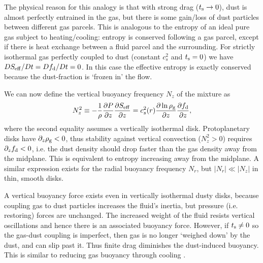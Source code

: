 
The physical reason for this analogy is that with strong drag
($t_\mathrm{s}\to0$), dust is almost perfectly entrained in the gas, but
there is some gain/loss of dust particles between different  
gas parcels. This is analogous to the entropy of an ideal 
pure gas subject to heating/cooling: entropy is conserved following
a gas parcel, except if there is heat exchange between a fluid parcel and the
surrounding. For strictly isothermal gas perfectly coupled to dust
(constant $c_s^2$ and $t_\mathrm{s}=0$) we have 
$DS_\mathrm{eff}/ D t = Df_\mathrm{d}/D t=0$. In this case the effective 
entropy is exactly conserved because the dust-fraction is `frozen in' the
flow. 


We can now define the vertical buoyancy frequency $N_z$ of the mixture
as    
\begin{align}
  N_z^2 \equiv - \frac{1}{\rho}\frac{\partial P}{\partial z}\frac{\partial S_\mathrm{eff}}{\partial z}
  =c_s^2(r) \frac{\partial \ln{\rho_\mathrm{g}}}{\partial z}\frac{\partial f_\mathrm{d}}{\partial z},
\end{align}
where the second equality assumes a vertically isothermal disk. 
Protoplanetary disks have $\partial_z\rho_\mathrm{g}<0$, thus stability against vertical 
convection ($N_z^2>0$) requires $\partial_zf_\mathrm{d} <0 $, i.e. the dust density should drop faster 
than the gas density away from the midplane. 
This is equivalent to 
entropy increasing away from the midplane. A similar expression exists
for the radial buoyancy frequency $N_r$, but $|N_r|\ll |N_z|$ in thin,
smooth disks. 

A vertical buoyancy force exists even in vertically isothermal
dusty disks, because coupling gas to dust particles increases
the fluid's inertia, but pressure (i.e. restoring) forces are
unchanged. The increased weight of the fluid resists vertical
oscillations and hence there is an associated buoyancy force. However,
if $t_\mathrm{s}\neq0$ so the gas-dust coupling is imperfect, then gas is no
longer `weighed down' by the dust, and can slip past it. Thus finite
drag diminishes the dust-induced buoyancy. This is similar to reducing
gas buoyancy through cooling \citep{lin15}. 

